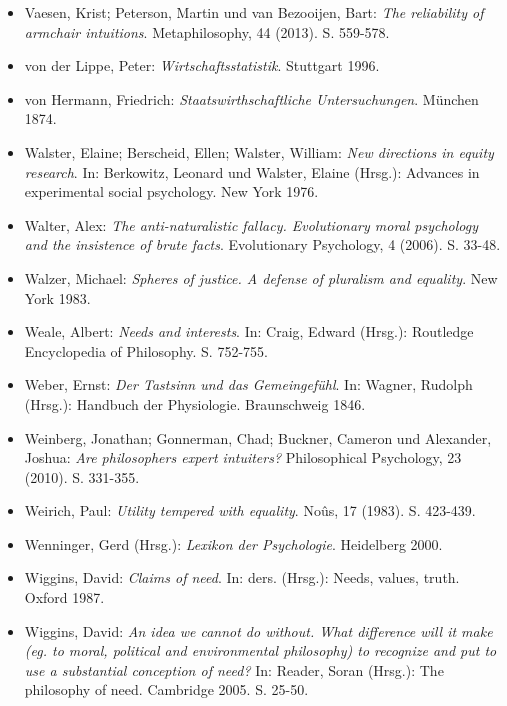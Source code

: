 \documentclass[a4paper]{thesis}
\begin{document}
\begin{itemize}[leftmargin=1.5em,label={},itemindent=-1.5em, itemsep=-1ex]
\item Vaesen, Krist; Peterson, Martin und van Bezooijen, Bart: \textit{The reliability of armchair intuitions}. Metaphilosophy, 44 (2013). S. 559-578. 

\item von der Lippe, Peter: \textit{Wirtschaftsstatistik}. Stuttgart 1996.

\item von Hermann, Friedrich: \textit{Staatswirthschaftliche Untersuchungen}. München 1874.

\item Walster, Elaine; Berscheid, Ellen; Walster, William: \textit{New directions in equity research}. In: Berkowitz, Leonard und Walster, Elaine (Hrsg.): Advances in experimental social psychology. New York 1976.

\item Walter, Alex: \textit{The anti-naturalistic fallacy. Evolutionary moral psychology and the insistence of brute facts}. Evolutionary Psychology, 4 (2006). S. 33-48.

\item Walzer, Michael: \textit{Spheres of justice. A defense of pluralism and equality}. New York 1983.

\item Weale, Albert: \textit{Needs and interests}. In: Craig, Edward (Hrsg.): Routledge Encyclopedia of Philosophy. S. 752-755.

\item Weber, Ernst: \textit{Der Tastsinn und das Gemeingefühl}. In: Wagner, Rudolph (Hrsg.): Handbuch der Physiologie. Braunschweig 1846.

\item Weinberg, Jonathan; Gonnerman, Chad; Buckner, Cameron und Alexander, Joshua: \textit{Are philosophers expert intuiters?} Philosophical Psychology, 23 (2010). S. 331-355.

\item Weirich, Paul: \textit{Utility tempered with equality}. Noûs, 17 (1983). S. 423-439.

\item Wenninger, Gerd (Hrsg.): \textit{Lexikon der Psychologie}. Heidelberg 2000.

\item Wiggins, David: \textit{Claims of need}. In: ders. (Hrsg.): Needs, values, truth. Oxford 1987.

\item Wiggins, David: \textit{An idea we cannot do without. What difference will it make (eg. to moral, political and environmental philosophy) to recognize and put to use a substantial conception of need?} In: Reader, Soran (Hrsg.): The philosophy of need. Cambridge 2005. S. 25-50.


\end{itemize}
\end{document}

